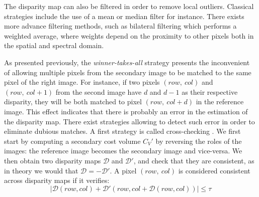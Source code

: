The disparity map can also be filtered in order to remove local outliers. Classical strategies include the use of a mean or median filter for instance. There exists more advance filtering methods, such as bilateral filtering \cite{tomasi_bilateral_1998} which performs a weighted average, where weights depend on the proximity to other pixels both in the spatial and spectral domain.   

As presented previously, the \textit{winner-takes-all} strategy presents the inconvenient of allowing multiple pixels from the secondary image to be matched to the same pixel of the right image. For instance, if two pixels $(row,~col)$ and $(row,~col+1)$ from the second image have $d$ and $d-1$ as their respective disparity, they will be both matched to pixel $(row, ~col+d)$ in the reference image. This effect indicates that there is probably an error in the estimation of the disparity map. There exist strategies allowing to detect such error in order to eliminate dubious matches. A first strategy is called cross-checking \cite{fua_combining_1991}. We first start by computing a secondary cost volume $C_V'$ by reversing the roles of the images: the reference image becomes the secondary image and vice-versa. We then obtain two disparity maps $\mathcal{D}$ and $\mathcal{D}'$, and check that they are consistent, as in theory we would that $\mathcal{D}=-\mathcal{D}'$. A pixel $(row, ~col)$ is considered consistent across disparity maps if it verifies:
\begin{equation}\label{eq:cross-checking}
    |\mathcal{D}(row, col) + \mathcal{D}'(row, col+\mathcal{D}(row, col))|\leqslant \tau
\end{equation}
